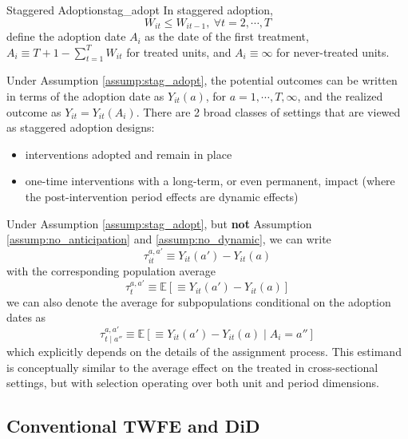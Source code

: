 \documentclass[twoside]{article}
\begin{document}
\begin{assumption}{Staggered Adoption}{stag_adopt}
    In staggered adoption, $$W_{it}\leq W_{it-1},\ \forall t=2,\cdots,T$$
    define the adoption date $A_i$ as the date of the first treatment, $A_i\equiv T+1-\sum^T_{t=1}W_{it}$ for treated units, and $A_i\equiv \infty$ for never-treated units.
\end{assumption}
Under Assumption \ref{assump:stag_adopt}, the potential outcomes can be written in terms of the adoption date as $Y_{it}(a)$, for $a=1,\cdots,T,\infty$, and the realized outcome as $Y_{it}=Y_{it}\left(A_i\right)$. There are 2 broad classes of settings that are viewed as staggered adoption designs:
\begin{itemize}
    \item interventions adopted and remain in place 
    \item one-time interventions with a long-term, or even permanent, impact (where the post-intervention period effects are dynamic effects)
\end{itemize}
Under Assumption \ref{assump:stag_adopt}, but \textbf{not} Assumption \ref{assump:no_anticipation} and \ref{assump:no_dynamic}, we can write 
$$ \tau_{it}^{a,a'}\equiv Y_{it}\left(a'\right)-Y_{it}(a) $$
with the corresponding population average
$$ \tau_t^{a,a'}\equiv \mathbb{E}\left[ \equiv Y_{it}\left(a'\right)-Y_{it}(a) \right] $$
we can also denote the average for subpopulations conditional on the adoption dates as 
$$ \tau_{t\mid a''}^{a,a'}\equiv \mathbb{E}\left[\equiv Y_{it}\left(a'\right)-Y_{it}(a)\mid A_i=a''\right] $$
which explicitly depends on the details of the assignment process. This estimand is conceptually similar to the average effect on the treated in cross-sectional settings, but with selection operating over both unit and period dimensions.

\subsection{Conventional TWFE and DiD}
\end{document}
